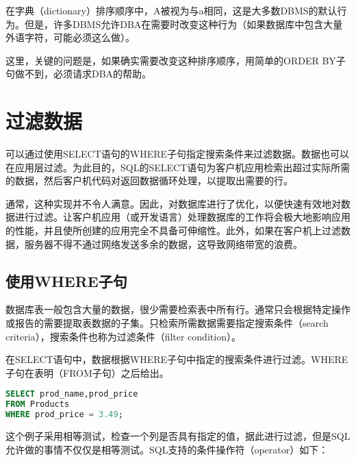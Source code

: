 在字典（dictionary）排序顺序中，A被视为与a相同，这是大多数DBMS的默认行为。但是，许多DBMS允许DBA在需要时改变这种行为（如果数据库中包含大量外语字符，可能必须这么做）。

这里，关键的问题是，如果确实需要改变这种排序顺序，用简单的ORDER BY子句做不到，必须请求DBA的帮助。
\section{过滤数据}

可以通过使用SELECT语句的WHERE子句指定搜索条件来过滤数据。数据也可以在应用层过滤。为此目的，SQL的SELECT语句为客户机应用检索出超过实际所需的数据，然后客户机代码对返回数据循环处理，以提取出需要的行。

通常，这种实现并不令人满意。因此，对数据库进行了优化，以便快速有效地对数据进行过滤。让客户机应用（或开发语言）处理数据库的工作将会极大地影响应用的性能，并且使所创建的应用完全不具备可伸缩性。此外，如果在客户机上过滤数据，服务器不得不通过网络发送多余的数据，这导致网络带宽的浪费。
\subsection{使用WHERE子句}

数据库表一般包含大量的数据，很少需要检索表中所有行。通常只会根据特定操作或报告的需要提取表数据的子集。只检索所需数据需要指定搜索条件（search criteria），搜索条件也称为过滤条件（filter condition）。

在SELECT语句中，数据根据WHERE子句中指定的搜索条件进行过滤。WHERE子句在表明（FROM子句）之后给出。

\begin{lstlisting}[language=SQL]
SELECT prod_name,prod_price
FROM Products
WHERE prod_price = 3.49;
\end{lstlisting}

这个例子采用相等测试，检查一个列是否具有指定的值，据此进行过滤，但是SQL允许做的事情不仅仅是相等测试。SQL支持的条件操作符（operator）如下：

